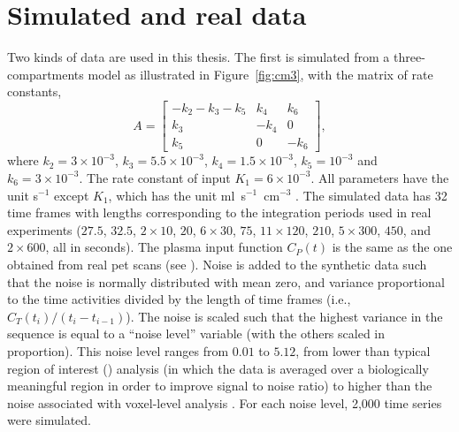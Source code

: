 \section[Simulated and real \protect\pet data]{Simulated and real \protect\pet data}
\label{sec:Simulated and real pet data}



Two kinds of data are used in this thesis. The first is simulated from a three-compartments model as illustrated in Figure~\ref{fig:cm3}, with the matrix of rate constants,
\begin{equation}
  A = \begin{bmatrix}
    - k_2 - k_3 - k_5 & k_4  & k_6 \\
    k_3               & -k_4 & 0   \\
    k_5               & 0    & -k_6
  \end{bmatrix},
\end{equation}
where $k_2 = 3 \times 10^{-3}$, $k_3 = 5.5 \times 10^{-3}$, $k_4 = 1.5 \times 10^{-3}$, $k_5 = 10^{-3}$ and $k_6 = 3 \times 10^{-3}$. The rate constant of input $K_1 = 6\times 10^{-3}$. All parameters have the unit s$^{-1}$ except $K_1$, which has the unit ml~s$^{-1}$~cm$^{-3}$ \cite{RLNomen}. The simulated data has 32 time frames with lengths corresponding to the integration periods used in real experiments ($27.5$, $32.5$, $2 \times 10$, $20$, $6 \times 30$, $75$, $11 \times 120$, $210$, $5 \times 300$, $450$, and $2 \times 600$, all in seconds). The plasma input function $C_P(t)$ is the same as the one obtained from real pet scans (see ). Noise is added to the synthetic data such that the noise is normally distributed with mean zero, and variance proportional to the time activities divided by the length of time frames (i.e., $C_T(t_i)/(t_i - t_{i-1})$). The noise is scaled such that the highest variance in the sequence is equal to a ``noise level'' variable (with the others scaled in proportion). This noise level ranges from $0.01$ to $5.12$, from lower than typical region of interest (\roi) analysis (in which the data is averaged over a biologically meaningful region in order to improve signal to noise ratio) to higher than the noise associated with voxel-level analysis \citep{Peng:2008fx}. For each noise level, 2,000 time series were simulated.


